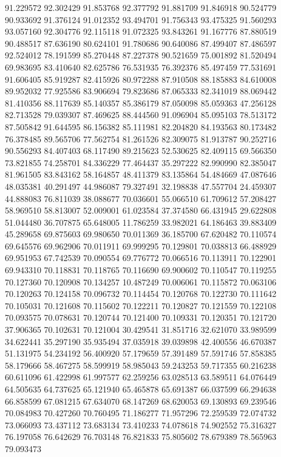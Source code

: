 91.229572
92.302429
91.853768
92.377792
91.881709
91.846918
90.524779
90.933692
91.376124
91.012352
93.494701
91.756343
93.475325
91.560293
93.057160
92.304776
92.115118
91.072325
93.843261
91.167776
87.880519
90.488517
87.636190
80.624101
91.780686
90.640086
87.499407
87.486597
92.524012
78.191599
85.270448
87.227378
90.521659
75.001892
81.520494
69.983695
83.410640
82.625786
76.531935
76.392376
85.497459
77.531691
91.606405
85.919287
82.415926
80.972288
87.910508
88.185883
84.610008
89.952032
77.925586
83.906694
79.823686
87.065333
82.341019
88.069442
81.410356
88.117639
85.140357
85.386179
87.050098
85.059363
47.256128
82.713528
79.039307
87.469625
88.444560
91.096904
85.095103
78.513172
87.505842
91.644595
86.156382
85.111981
82.204820
84.193563
80.173482
76.378485
89.565706
77.562754
81.261526
82.309075
81.913787
90.252716
90.556293
84.407403
68.117490
89.215623
52.530625
82.409115
69.566350
73.821855
74.258701
84.336229
77.464437
35.297222
82.990990
82.385047
81.961505
83.843162
58.164857
48.411379
83.135864
54.484669
47.087646
48.035381
40.291497
44.986087
79.327491
32.198838
47.557704
24.459307
44.888083
76.811039
38.088677
70.036601
55.066510
61.709612
57.208427
58.969510
58.813007
52.009001
61.023584
37.374580
66.431945
29.622808
51.044480
36.707875
65.648005
11.786259
33.982021
64.186463
39.883409
45.289658
69.875603
69.980650
70.011369
36.185700
67.620482
70.110574
69.645576
69.962906
70.011911
69.999295
70.129801
70.038813
66.488929
69.951953
67.742539
70.090554
69.776772
70.066516
70.113911
70.122901
69.943310
70.118831
70.118765
70.116690
69.900602
70.110547
70.119255
70.127360
70.120908
70.134257
10.487249
70.006061
70.115872
70.063106
70.120263
70.124158
70.096732
70.114454
70.120768
70.122730
70.111642
70.105031
70.121608
70.115602
70.122211
70.120827
70.121559
70.122108
70.093575
70.078631
70.120744
70.121400
70.109331
70.120351
70.121720
37.906365
70.102631
70.121004
30.429541
31.851716
32.621070
33.989599
34.622441
35.297190
35.935494
37.035918
39.039898
42.400556
46.670387
51.131975
54.234192
56.400920
57.179659
57.391489
57.591746
57.858385
58.179666
58.467275
58.599919
58.985043
59.243253
59.717355
60.216238
60.611096
61.422998
61.997577
62.259256
63.028513
63.589511
64.076449
64.505635
64.737625
65.121940
65.465878
65.691387
66.037599
66.294638
66.858599
67.081215
67.634070
68.147269
68.620053
69.130893
69.239546
70.084983
70.427260
70.760495
71.186277
71.957296
72.259539
72.074732
73.066093
73.437112
73.683134
73.410233
74.078618
74.902552
75.316327
76.197058
76.642629
76.703148
76.821833
75.805602
78.679389
78.565963
79.093473
